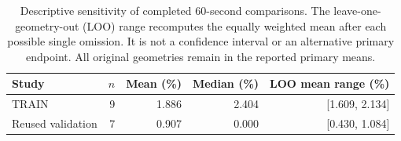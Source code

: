 \begin{table}[htbp]
\centering
\small
\begin{tabular}{lrrrr}
\toprule
Study & $n$ & Mean (\%) & Median (\%) & LOO mean range (\%) \\
\midrule
TRAIN & 9 & 1.886 & 2.404 & [1.609, 2.134] \\
Reused validation & 7 & 0.907 & 0.000 & [0.430, 1.084] \\
\bottomrule
\end{tabular}
\caption{Descriptive sensitivity of completed 60-second comparisons. The leave-one-geometry-out (LOO) range recomputes the equally weighted mean after each possible single omission. It is not a confidence interval or an alternative primary endpoint. All original geometries remain in the reported primary means.}
\label{tab:geometry-sensitivity}
\end{table}

